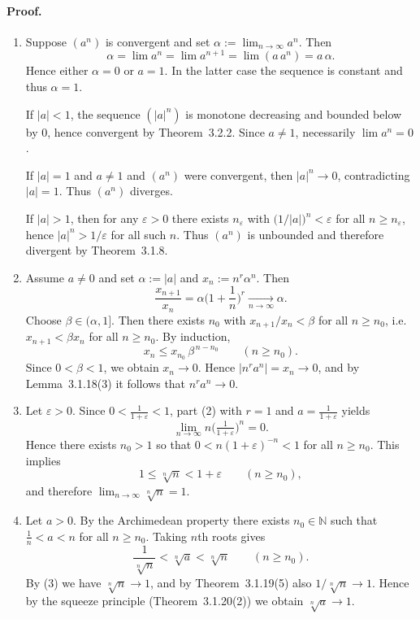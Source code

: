 \documentclass[12pt,a4paper]{article}
\newcommand{\N}{\mathbb{N}}
\newcommand{\eps}{\varepsilon}
\theoremstyle{plain}
\theoremstyle{definition}
\theoremstyle{remark}
\begin{document}
	\paragraph{Proof.}
	\begin{enumerate}[label={(\arabic*)}, leftmargin=*]
		\item Suppose $(a^n)$ is convergent and set $\alpha:=\lim_{n\to\infty} a^n$. Then
		\[
			\alpha = \lim a^n = \lim a^{n+1} = \lim (a\,a^n) = a\,\alpha.
		\]
		Hence either $\alpha=0$ or $a=1$. In the latter case the sequence is constant and thus $\alpha=1$.

		If $|a|<1$, the sequence $(|a|^n)$ is monotone decreasing and bounded below by $0$, hence convergent by Theorem~3.2.2. Since $a\ne1$, necessarily $\lim a^n=0$.

		If $|a|=1$ and $a\ne1$ and $(a^n)$ were convergent, then $|a|^n\to0$, contradicting $|a|=1$. Thus $(a^n)$ diverges.

		If $|a|>1$, then for any $\eps>0$ there exists $n_\eps$ with $\big(1/|a|\big)^n<\eps$ for all $n\ge n_\eps$, hence $|a|^n>1/\eps$ for all such $n$. Thus $(a^n)$ is unbounded and therefore divergent by Theorem~3.1.8.

		\item Assume $a\ne0$ and set $\alpha:=|a|$ and $x_n:=n^r\alpha^n$. Then
		\[
			\frac{x_{n+1}}{x_n} = \alpha\Big(1+\frac{1}{n}\Big)^{\!r} \xrightarrow[n\to\infty]{} \alpha.
		\]
		Choose $\beta\in(\alpha,1]$. Then there exists $n_0$ with $x_{n+1}/x_n<\beta$ for all $n\ge n_0$, i.e. $x_{n+1}<\beta x_n$ for all $n\ge n_0$. By induction,
		\[
			x_n \le x_{n_0}\,\beta^{\,n-n_0}\qquad (n\ge n_0).
		\]
		Since $0<\beta<1$, we obtain $x_n\to0$. Hence $|n^r a^n|=x_n\to0$, and by Lemma~3.1.18(3) it follows that $n^r a^n\to0$.

		\item Let $\eps>0$. Since $0<\tfrac{1}{1+\eps}<1$, part (2) with $r=1$ and $a=\tfrac{1}{1+\eps}$ yields
		\[
			\lim_{n\to\infty} n\Big(\tfrac{1}{1+\eps}\Big)^{\!n} = 0.
		\]
		Hence there exists $n_0>1$ so that $0<n(1+\eps)^{-n}<1$ for all $n\ge n_0$. This implies
		\[
			1 \le \sqrt[n]{n} < 1+\eps \qquad (n\ge n_0),
		\]
		and therefore $\lim_{n\to\infty} \sqrt[n]{n} = 1$.
			\item Let $a>0$. By the Archimedean property there exists $n_0\in\N$ such that $\tfrac{1}{n}<a<n$ for all $n\ge n_0$. Taking $n$th roots gives
			\[
				\frac{1}{\sqrt[n]{n}} < \sqrt[n]{a} < \sqrt[n]{n} \qquad (n\ge n_0).
			\]
			By (3) we have $\sqrt[n]{n}\to 1$, and by Theorem~3.1.19(5) also $1/\sqrt[n]{n}\to 1$. Hence by the squeeze principle (Theorem~3.1.20(2)) we obtain $\sqrt[n]{a}\to 1$.


\end{enumerate}
\end{document}
